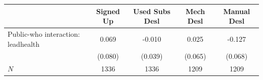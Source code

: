 \begin{tabular}{lcccc}
\hline\hline
 & Signed Up & Used Subs Desl & Mech Desl & Manual Desl \\
\hline
Public-who interaction: leadhealth & 0.069 & -0.010 & 0.025 & -0.127 \\
 & (0.080) & (0.039) & (0.065) & (0.068) \\
\hline
$N$ & 1336 & 1336 & 1209 & 1209 \\
\hline\hline
\end{tabular}
